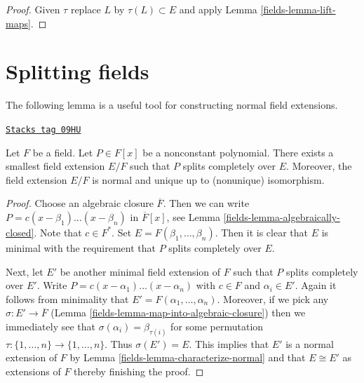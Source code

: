 \begin{proof}

Given $\tau$ replace $L$ by $\tau(L) \subset E$ and apply
Lemma \ref{fields-lemma-lift-maps}.
\end{proof}

\section{Splitting fields}
\label{fields-section-splitting-fieds}
The following lemma is a useful tool for constructing normal field extensions.

\begin{lemma}
\label{fields-lemma-splitting-field}
\href{https://stacks.math.columbia.edu/tag/09HU}{\texttt{Stacks tag 09HU}}

Let $F$ be a field. Let $P \in F[x]$ be a nonconstant polynomial.
There exists a smallest field extension $E/F$ such that $P$
splits completely over $E$. Moreover, the field extension $E/F$ is normal
and unique up to (nonunique) isomorphism.
\end{lemma}

\begin{proof}

Choose an algebraic closure $\overline{F}$. Then we can write
$P = c (x - \beta_1) \ldots (x - \beta_n)$ in $\overline{F}[x]$, see
Lemma \ref{fields-lemma-algebraically-closed}. Note that $c \in F^*$. Set
$E = F(\beta_1, \ldots, \beta_n)$. Then it is clear that $E$ is
minimal with the requirement that $P$ splits completely over $E$.

\medskip\noindent
Next, let $E'$ be another minimal field extension of $F$ such that
$P$ splits completely over $E'$. Write
$P = c (x - \alpha_1) \ldots (x - \alpha_n)$ with $c \in F$ and
$\alpha_i \in E'$. Again it follows from minimality that
$E' = F(\alpha_1, \ldots, \alpha_n)$. Moreover, if we pick
any $\sigma : E' \to \overline{F}$
(Lemma \ref{fields-lemma-map-into-algebraic-closure})
then we immediately see that $\sigma(\alpha_i) = \beta_{\tau(i)}$
for some permutation $\tau : \{1, \ldots, n\} \to \{1, \ldots, n\}$.
Thus $\sigma(E') = E$. This implies that $E'$ is a normal extension
of $F$ by Lemma \ref{fields-lemma-characterize-normal}
and that $E \cong E'$ as extensions of $F$ thereby finishing the proof.
\end{proof}

